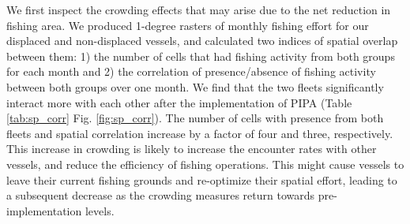 \documentclass[9p,twocolumn,twoside,lineno]{pnas-new}
\begin{document}
We first inspect the crowding effects that may arise due to the net reduction in fishing area. We produced 1-degree rasters of monthly fishing effort for our displaced and non-displaced vessels, and calculated two indices of spatial overlap between them: 1) the number of cells that had fishing activity from both groups for each month and 2) the correlation of presence/absence of fishing activity between both groups over one month. We find that the two fleets significantly interact more with each other after the implementation of PIPA (Table \ref{tab:sp_corr} Fig. \ref{fig:sp_corr}). The number of cells with presence from both fleets and spatial correlation increase by a factor of four and three, respectively. This increase in crowding is likely to increase the encounter rates with other vessels, and reduce the efficiency of fishing operations. This might cause vessels to leave their current fishing grounds and re-optimize their spatial effort, leading to a subsequent decrease as the crowding measures return towards pre-implementation levels.
\end{document}

